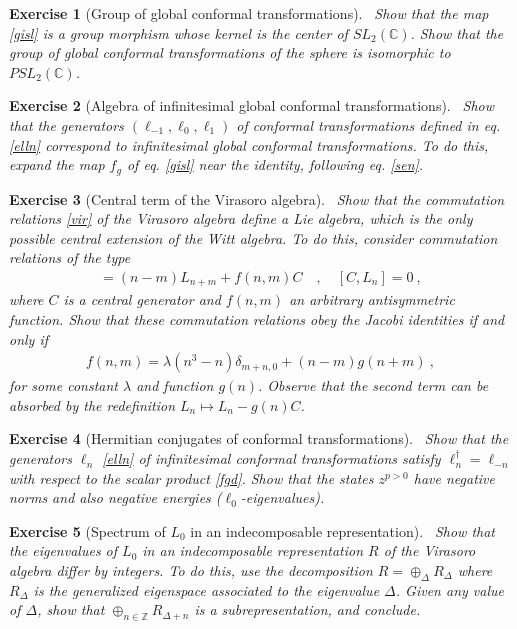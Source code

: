 \documentclass[12pt,a4paper,notitlepage]{report}
\numberwithin{equation}{section}
\theoremstyle{break}
\newtheorem{exo}{Exercise}[chapter]
\begin{document}
\begin{exo}[Group of global conformal transformations]
 ~\label{exoiso}
Show that the map \eqref{gisl} is a group morphism whose kernel is the center of $SL_2({\mathbb{C}})$.
Show that the group of global conformal transformations of the sphere is isomorphic to $PSL_2({\mathbb{C}})$. 
\end{exo}

\begin{exo}[Algebra of infinitesimal global conformal transformations]
 ~\label{exomoz}
Show that the generators $(\ell_{-1},\ell_0,\ell_1)$ of conformal transformations defined in eq. \eqref{elln} correspond to infinitesimal global conformal transformations.
To do this, expand the map $f_g$ of eq. \eqref{gisl} near the identity, following eq. \eqref{sen}.
\end{exo}


\begin{exo}[Central term of the Virasoro algebra]
~\label{exovir}
 Show that the commutation relations \eqref{vir} of the Virasoro algebra define a Lie algebra, which is the only possible central extension of the Witt algebra.
To do this, consider commutation relations of the type
\begin{align}
 [L_n,L_m] =(n-m)L_{n+m} + f(n,m) C  \quad , \quad [C,L_n]=0\ ,
\end{align}
where $C$ is a central generator and $f(n,m)$ an arbitrary antisymmetric function.
Show that these commutation relations obey the Jacobi identities if and only if 
\begin{align}
 f(n,m) = \lambda (n^3-n)\delta_{m+n,0} + (n-m)g(n+m)\ ,
\end{align}
for some constant $\lambda$ and function $g(n)$.
Observe that the second term can be absorbed by the redefinition $L_n\mapsto L_n-g(n)C$.
\end{exo}

\begin{exo}[Hermitian conjugates of conformal transformations]
 ~\label{exolnd}
Show that the generators $\ell_n$ \eqref{elln} of infinitesimal conformal transformations satisfy $\ell_n^\dagger =\ell_{-n}$ with respect to the scalar product \eqref{fgd}.
Show that the states $z^{p>0}$ have negative norms and also negative energies ($\ell_0$-eigenvalues). 
\end{exo}

\begin{exo}[Spectrum of $L_0$ in an indecomposable representation]
 ~\label{exodiffint}
Show that the eigenvalues of $L_0$ in an indecomposable representation $R$ of the Virasoro algebra differ by integers.
To do this, use the decomposition $R=\oplus_\Delta R_\Delta$ where $R_\Delta$ is the generalized eigenspace associated to the eigenvalue $\Delta$.
Given any value of $\Delta$, show that  $\oplus_{n\in{\mathbb{Z}}} R_{\Delta+n}$ is a subrepresentation, and conclude. 
\end{exo}
\end{document}
